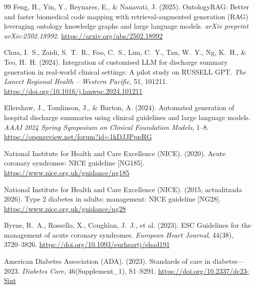 \documentclass[CAT]{TFUOC}%
\begin{document}
\begin{thebibliography}{99}
Feng, H., Yin, Y., Reynares, E., \& Nanavati, J. (2025).
\newblock OntologyRAG: Better and faster biomedical code mapping with retrieval-augmented generation (RAG) leveraging ontology knowledge graphs and large language models.
\newblock \textit{arXiv preprint arXiv:2502.18992}.
\newblock \url{https://arxiv.org/abs/2502.18992}


Chua, I.~S., Zaidi, S.~T.~R., Foo, C.~S., Lim, C.~Y.,
Tan, W.~Y., Ng, K.~H., \& Teo, H.~H. (2024).
\newblock Integration of customised LLM for discharge summary
generation in real-world clinical settings: A pilot study
on RUSSELL GPT.
\newblock \textit{The Lancet Regional Health -- Western
Pacific}, 51, 101211.
\newblock \url{https://doi.org/10.1016/j.lanwpc.2024.101211}

Ellershaw, J., Tomlinson, J., \& Burton, A. (2024).
\newblock Automated generation of hospital discharge summaries
using clinical guidelines and large language models.
\newblock \textit{AAAI 2024 Spring Symposium on Clinical
Foundation Models}, 1--8.
\newblock \url{https://openreview.net/forum?id=1kDJJPppRG}


National Institute for Health and Care Excellence (NICE). (2020).
\newblock Acute coronary syndromes: NICE guideline [NG185].
\newblock \url{https://www.nice.org.uk/guidance/ng185}

National Institute for Health and Care Excellence (NICE). (2015, actualitzada 2026).
\newblock Type 2 diabetes in adults: management: NICE guideline [NG28].
\newblock \url{https://www.nice.org.uk/guidance/ng28}

Byrne, R.~A., Rossello, X., Coughlan, J.~J., et al. (2023).
 ESC Guidelines for the management of acute coronary syndromes.
\newblock \textit{European Heart Journal}, 44(38), 3720--3826.
\newblock \url{https://doi.org/10.1093/eurheartj/ehad191}

American Diabetes Association (ADA). (2023).
\newblock Standards of care in diabetes---2023.
\newblock \textit{Diabetes Care}, 46(Supplement\_1), S1--S291.
\newblock \url{https://doi.org/10.2337/dc23-Sint}


\end{thebibliography}
\end{document}
